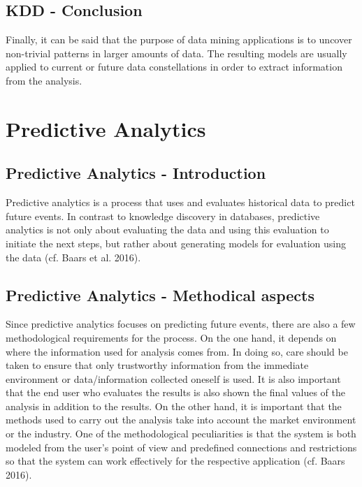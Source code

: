 \documentclass[12pt,twocolumn,twoside]{conference}   %
\begin{document}
\subsection{KDD - Conclusion}
Finally, it can be said that the purpose of data mining applications is to uncover non-trivial patterns in larger amounts of data. The resulting models are usually applied to current or future data constellations in order to extract information from the analysis.

\section{Predictive Analytics}
\subsection{Predictive Analytics - Introduction}
Predictive analytics is a process that uses and evaluates historical data to predict future events. In contrast to knowledge discovery in databases, predictive analytics is not only about evaluating the data and using this evaluation to initiate the next steps, but rather about generating models for evaluation using the data (cf. Baars et al. 2016). 

\subsection{Predictive Analytics - Methodical aspects}
Since predictive analytics focuses on predicting future events, there are also a few methodological requirements for the process. On the one hand, it depends on where the information used for analysis comes from. In doing so, care should be taken to ensure that only trustworthy information from the immediate environment or data/information collected oneself is used. It is also important that the end user who evaluates the results is also shown the final values of the analysis in addition to the results. On the other hand, it is important that the methods used to carry out the analysis take into account the market environment or the industry. One of the methodological peculiarities is that the system is both modeled from the user's point of view and predefined connections and restrictions so that the system can work effectively for the respective application (cf. Baars 2016).
\end{document}

